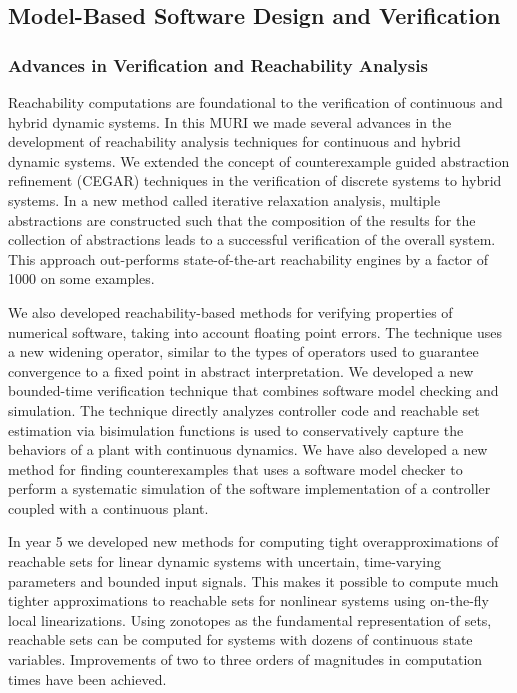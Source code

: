 \subsection{Model-Based Software Design and Verification}

\subsubsection{Advances in Verification and Reachability Analysis}

Reachability computations are foundational to the verification of continuous and hybrid dynamic systems.  In this MURI we made several advances in the development of reachability analysis techniques for continuous and hybrid dynamic systems.  We extended the concept of counterexample guided abstraction refinement (CEGAR) techniques in the verification of discrete systems to hybrid systems.  In a new method called iterative relaxation analysis, multiple abstractions are constructed such that the composition of the results for the collection of abstractions leads to a successful verification of the overall system.  This approach out-performs state-of-the-art reachability engines by a factor of 1000 on some examples.

We also developed reachability-based methods for verifying properties of numerical software, taking into account floating point errors.  The technique uses a new widening operator, similar to the types of operators used to guarantee convergence to a fixed point in abstract interpretation.  We developed a new bounded-time verification technique that combines software model checking and simulation.  The technique directly analyzes controller code and reachable set estimation via bisimulation functions is used to conservatively capture the behaviors of a plant with continuous dynamics.  We have also developed a new method for finding counterexamples that uses a software model checker to perform a systematic simulation of the software implementation of a controller coupled with a continuous plant. 

 In year 5 we developed new methods for computing tight overapproximations of reachable sets for linear dynamic systems with uncertain, time-varying parameters and bounded input signals.   This makes it possible to compute much tighter approximations to reachable sets for nonlinear systems using on-the-fly local linearizations.  Using zonotopes as the fundamental representation of sets, reachable sets can be computed for systems with dozens of continuous state variables.  Improvements of two to three orders of magnitudes in computation times have been achieved.

